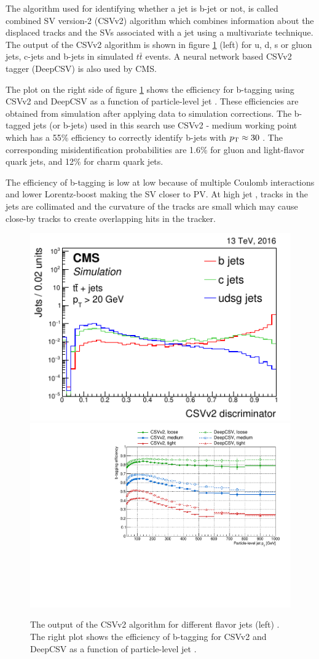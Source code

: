 The algorithm used for identifying whether a jet is b-jet or not, is called combined SV version-2 (CSVv2) algorithm \cite{BTV-16-002} which combines information about the displaced tracks and the SVs associated with a jet using a multivariate technique. The output of the CSVv2 algorithm is shown in figure \ref{fig:bTagCSVv2op} (left) for u, d, s or gluon jets, c-jets and b-jets in simulated $t\bar{t}$ events. A neural network based CSVv2 tagger (DeepCSV) is also used by CMS. 

The plot on the right side of figure \ref{fig:bTagCSVv2op} shows the efficiency for b-tagging using CSVv2 and DeepCSV as a function of particle-level jet \pt. These efficiencies are obtained from simulation after applying data to simulation corrections. The b-tagged jets (or b-jets) used in this search use CSVv2 - medium working point which has a 55\% efficiency to correctly identify b-jets with $p_{\mathrm{T}} \approx 30$ \gev. The corresponding misidentification probabilities are 1.6\% for gluon and light-flavor quark jets, and 12\% for charm quark jets. 

The efficiency of b-tagging is low at low \pt because of multiple Coulomb interactions and lower Lorentz-boost making the SV closer to PV. At high jet \pt, tracks in the jets are collimated and the curvature of the tracks are small which may cause close-by tracks to create overlapping hits in the tracker.
\begin{figure}[h!]
\centering
\includegraphics[width=0.44\linewidth]{../Figures/Chap2/bTagCSVv2op}
\includegraphics[width=0.52\linewidth]{../Figures/Chap2/btag_eff_CSVv2_DeepCSV}
\captionsetup{width=.98\linewidth}
\caption[CSVv2 output and b-tagging efficiency]{The output of the CSVv2 algorithm for different flavor jets (left) \cite{BTV-16-002}. The right plot shows the efficiency of b-tagging for CSVv2 and DeepCSV as a function of particle-level jet \pt \cite{btagEffTwiki}.}
\label{fig:bTagCSVv2op}
\end{figure}
